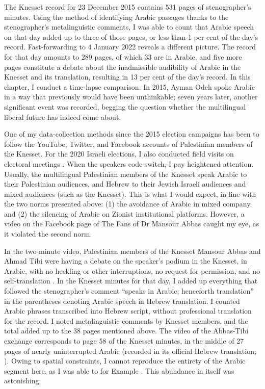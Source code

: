 \documentclass[output=paper,arabicfont]{langscibook}
\begin{document}
The Knesset record for 23 December 2015 contains 531 pages of stenographer’s minutes. Using the method of identifying Arabic passages thanks to the stenographer’s metalinguistic comments, I was able to count that Arabic speech on that day added up to three of those pages, or less than 1 per cent of the day’s record. Fast-forwarding to 4 January 2022 reveals a different picture. The record for that day amounts to 289 pages, of which 33 are in Arabic, and five more pages constitute a debate about the inadmissible audibility of Arabic in the Knesset and its translation, resulting in 13 per cent of the day’s record. In this chapter, I conduct a time-lapse comparison. In 2015, Ayman Odeh spoke Arabic in a way that previously would have been unthinkable; seven years later, another significant event was recorded, begging the question whether the multilingual liberal future has indeed come about. 

One of my data-collection methods since the 2015 election campaigns has been to follow the YouTube, Twitter, and Facebook accounts of Palestinian members of the Knesset. For the 2020 Israeli elections, I also conducted field visits on electoral meetings \citep{hawker2020a}. When the speakers code-switch, I pay heightened attention. Usually, the multilingual Palestinian members of the Knesset speak Arabic to their Palestinian audiences, and Hebrew to their Jewish Israeli audiences and mixed audiences (such as the Knesset). This is what I would expect, in line with the two norms presented above: (1) the avoidance of Arabic in mixed company, and (2) the silencing of Arabic on Zionist institutional platforms. However, a video on the Facebook page of The Fans of Dr Mansour Abbas caught my eye, as it violated the second norm. 

In the two-minute video, Palestinian members of the Knesset Mansour Abbas and Ahmad Tibi were having a debate on the speaker’s podium in the Knesset, in Arabic, with no heckling or other interruptions, no request for permission, and no self-translation \citep{facebook2022a}. In the Knesset minutes for that day, I added up everything that followed the stenographer’s comment “speaks in Arabic; henceforth translation” in the parentheses denoting Arabic speech in Hebrew translation. I counted Arabic phrases transcribed into Hebrew script, without professional translation for the record. I noted metalinguistic comments by Knesset members, and the total added up to the 38 pages mentioned above. The video of the Abbas-Tibi exchange corresponds to page 58 of the Knesset minutes, in the middle of 27 pages of nearly uninterrupted Arabic (recorded in its official Hebrew translation; \cite[45–72]{knesset2022-a}). Owing to spatial constraints, I cannot reproduce the entirety of the Arabic segment here, as I was able to for Example . This abundance in itself was astonishing.
\end{document}
